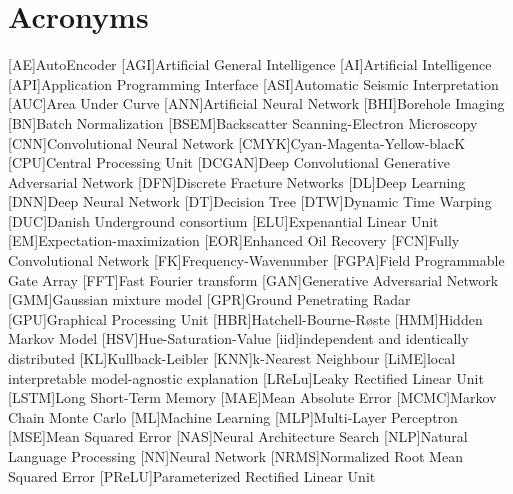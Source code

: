 \chapter{Acronyms}

\begin{acronym}[DCGANS]
[AE]{AutoEncoder}
[AGI]{Artificial General Intelligence}
[AI]{Artificial Intelligence}
[API]{Application Programming Interface}
[ASI]{Automatic Seismic Interpretation}
[AUC]{Area Under Curve}
[ANN]{Artificial Neural Network}
[BHI]{Borehole Imaging}
[BN]{Batch Normalization}
[BSEM]{Backscatter Scanning-Electron Microscopy}
[CNN]{Convolutional Neural Network}
[CMYK]{Cyan-Magenta-Yellow-blacK}
[CPU]{Central Processing Unit}
[DCGAN]{Deep Convolutional Generative Adversarial Network}
[DFN]{Discrete Fracture Networks}
[DL]{Deep Learning}
[DNN]{Deep Neural Network}
[DT]{Decision Tree}
[DTW]{Dynamic Time Warping}
[DUC]{Danish Underground consortium}
[ELU]{Expenantial Linear Unit}
[EM]{Expectation-maximization}
[EOR]{Enhanced Oil Recovery}
[FCN]{Fully Convolutional Network}
[FK]{Frequency-Wavenumber}
[FGPA]{Field Programmable Gate Array}
[FFT]{Fast Fourier transform}
[GAN]{Generative Adversarial Network}
[GMM]{Gaussian mixture model}
[GPR]{Ground Penetrating Radar}
[GPU]{Graphical Processing Unit}
[HBR]{Hatchell-Bourne-R{\o}ste}
[HMM]{Hidden Markov Model} 
[HSV]{Hue-Saturation-Value}
[iid]{independent and identically distributed}
[KL]{Kullback-Leibler}
[KNN]{k-Nearest Neighbour}
[LiME]{local interpretable model-agnostic explanation}
[LReLu]{Leaky Rectified Linear Unit}
[LSTM]{Long Short-Term Memory}
[MAE]{Mean Absolute Error}
[MCMC]{Markov Chain Monte Carlo}
[ML]{Machine Learning}
[MLP]{Multi-Layer Perceptron}
[MSE]{Mean Squared Error}
[NAS]{Neural Architecture Search}
[NLP]{Natural Language Processing}
[NN]{Neural Network}
[NRMS]{Normalized Root Mean Squared Error}
[PReLU]{Parameterized Rectified Linear Unit}

\end{acronym}
